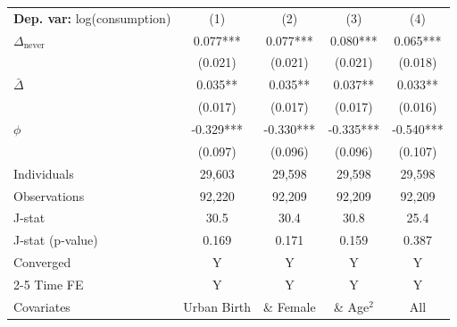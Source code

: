 \begin{tabular}{l cccc} \toprule  \textbf{Dep. var:}  log(consumption) 
                    &\multicolumn{1}{c}{(1)}   &\multicolumn{1}{c}{(2)}   &\multicolumn{1}{c}{(3)}   &\multicolumn{1}{c}{(4)}   \\

\addlinespace
$\Delta_{\text{never}}$&       0.077***&       0.077***&       0.080***&       0.065***\\
                    &     (0.021)   &     (0.021)   &     (0.021)   &     (0.018)   \\

\addlinespace
$\bar{\Delta}$      &       0.035** &       0.035** &       0.037** &       0.033** \\
                    &     (0.017)   &     (0.017)   &     (0.017)   &     (0.016)   \\

\addlinespace
$\phi$              &      -0.329***&      -0.330***&      -0.335***&      -0.540***\\
                    &     (0.097)   &     (0.096)   &     (0.096)   &     (0.107)   \\
\addlinespace
Individuals         &      29,603   &      29,598   &      29,598   &      29,598   \\
Observations        &      92,220   &      92,209   &      92,209   &      92,209   \\
J-stat              &        30.5   &        30.4   &        30.8   &        25.4   \\
J-stat (p-value)    &       0.169   &       0.171   &       0.159   &       0.387   \\
Converged           &           Y   &           Y   &           Y   &           Y   \\
\cmidrule{2-5} Time FE & Y & Y & Y & Y \\ Covariates & Urban Birth & \& Female & \& Age$^2$ & All \\ \bottomrule \end{tabular}
